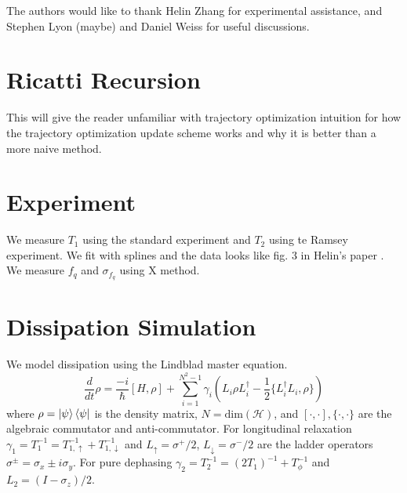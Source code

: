 \documentclass[
  amsfonts,
  amsmath,
  tbtags,
  amssymb,
  aps,
  nobibnotes,
  twocolumn,
  superscriptaddress,
]{revtex4-2}
\begin{document}
\begin{acknowledgments}
  The authors would like to thank Helin Zhang for experimental assistance,
  and Stephen Lyon (maybe) and Daniel Weiss for useful discussions.
\end{acknowledgments}


\appendix
\section{Ricatti Recursion}
This will give the reader unfamiliar with trajectory
optimization intuition for how the trajectory optimization
update scheme works and why it is better than
a more naive method.


\section{Experiment}
We measure $T_{1}$ using the standard experiment
and $T_{2}$ using te Ramsey experiment. We fit with splines
and the data looks like fig. 3 in Helin's paper \cite{zhang2020universal}.
We measure $f_{q}$ and $\sigma_{f_{q}}$ using X method.


\section{Dissipation Simulation}
We model dissipation using the Lindblad master
equation. 
\begin{equation}
  \frac{d}{dt} \rho = \frac{-i}{\hbar} [H, \rho] + \sum_{i = 1}^{N^{2} - 1} \gamma_{i} (L_{i} \rho L_{i}^{\dagger} - \frac{1}{2} \{L_{i}^{\dagger} L_{i}, \rho\})
\end{equation}
where $\rho = \ket{\psi}\bra{\psi}$ is the density matrix, $N = \textrm{dim}(\mathcal{H})$,
and $[\cdot, \cdot], \{\cdot, \cdot \}$ are the algebraic commutator and anti-commutator.
For longitudinal relaxation $\gamma_{1} = T_{1}^{-1} = T_{1, \uparrow}^{-1} + T_{1, \downarrow}^{-1}$
and $L_{\uparrow} = \sigma^{+}/2$,
$L_{\downarrow} = \sigma^{-}/2$
are the ladder operators $\sigma^{\pm} = \sigma_{x} \pm i \sigma_{y}$. For pure dephasing
$\gamma_{2} = T_{2}^{-1} = (2 T_{1})^{-1} + T_{\phi}^{-1}$ and
$L_{2} = (I - \sigma_{z})/2$.


\end{document}
